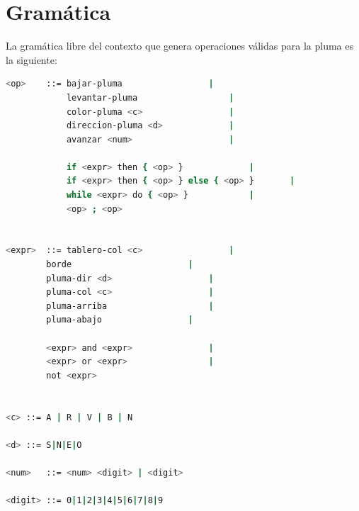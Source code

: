\documentclass[dcc]{fcfmcourse}
\begin{document}
\section*{Gramática}
La gramática libre del contexto que genera operaciones válidas para la pluma es la siguiente:
\begin{lstlisting}[language=bash]
<op>	::=	bajar-pluma					|
	    	levantar-pluma					|
	    	color-pluma <c>					|
	    	direccion-pluma <d>				|
	    	avanzar <num>					|
	    
	    	if <expr> then { <op> }				|
	    	if <expr> then { <op> } else { <op> }		|
	    	while <expr> do { <op> }			|
	    	<op> ; <op>
	    
	    
<expr>	::=	tablero-col <c>					|
		borde						|
		pluma-dir <d>					|
		pluma-col <c>					|
		pluma-arriba					|
		pluma-abajo					|
	
		<expr> and <expr>				|
		<expr> or <expr>				|
		not <expr>
		
		
<c>	::=	A | R | V | B | N

<d>	::=	S|N|E|O

<num>	::=	<num> <digit> | <digit>

<digit>	::=	0|1|2|3|4|5|6|7|8|9
\end{lstlisting}
\newpage
\end{document}
